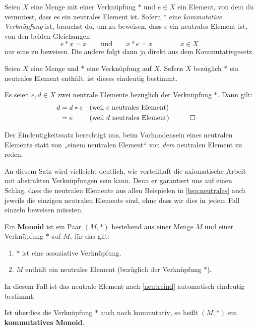 \begin{bem}
    Seien $X$ eine Menge mit einer Verknüpfung $*$ und $e\in X$ ein Element, von dem du vermutest, dass es ein neutrales Element ist. Sofern $*$ eine \emph{kommutative Verknüpfung} ist, brauchst du, um zu beweisen, dass $e$ ein neutrales Element ist, von den beiden Gleichungen
        \[ e*x=x \qquad\text{und}\qquad x*e=x \qquad\qquad x\in X \]
    nur eine zu beweisen. Die andere folgt dann ja direkt aus dem Kommutativgesetz.
\end{bem}


\begin{satz} \label{neutreind}
    Seien $X$ eine Menge und $*$ eine Verknüpfung auf $X$. Sofern $X$ bezüglich $*$ ein neutrales Element enthält, ist dieses eindeutig bestimmt.
\end{satz}
 

\begin{bew}
    Es seien $e,d\in X$ zwei neutrale Elemente bezüglich der Verknüpfung $*$. Dann gilt:
    \begin{align*}
        d & = d*e && (\text{weil $e$ neutrales Element}) \\
        & = e && (\text{weil $d$ neutrales Element}) && \qed
    \end{align*}
\end{bew}


\begin{bem}
    Der Eindeutigkeitssatz berechtigt uns, beim Vorhandensein eines neutralen Elements statt von „einem neutralen Element“ von \emph{dem} neutralen Element zu reden.
    
    An diesem Satz wird vielleicht deutlich, wie vorteilhaft die axiomatische Arbeit mit abstrakten Verknüpfungen sein kann. Denn er garantiert uns auf einen Schlag, dass die neutralen Elemente aus allen Beispielen in \cref{bsp:neutrales} auch jeweils die einzigen neutralen Elemente sind, ohne dass wir dies in jedem Fall einzeln beweisen müssten.
\end{bem}


\begin{de}[Monoid] 
    Ein \textbf{Monoid} ist ein Paar $(M,*)$ bestehend aus einer Menge $M$ und einer Verknüpfung $*$ auf $M$, für das gilt:
    \begin{enumerate}[(M1), labelindent=1.5em, leftmargin=*]
        \item $*$ ist eine assoziative Verknüpfung.
        \item $M$ enthält ein neutrales Element (bezüglich der Verknüpfung $*$).
    \end{enumerate}
    In diesem Fall ist das neutrale Element nach \cref{neutreind} automatisch eindeutig bestimmt.
    
    Ist überdies die Verknüpfung $*$ auch noch kommutativ, so heißt $(M,*)$ ein \textbf{kommutatives Monoid}.
\end{de}


